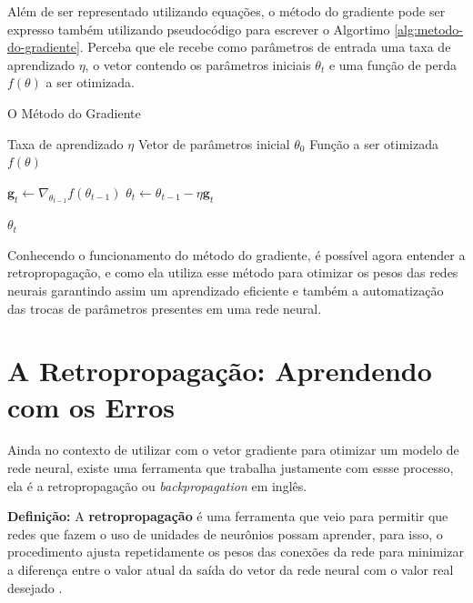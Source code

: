 Além de ser representado utilizando equações, o método do gradiente pode ser expresso também utilizando pseudocódigo para escrever o Algortimo \ref{alg:metodo-do-gradiente}. Perceba que ele recebe como parâmetros de entrada uma taxa de aprendizado $\eta$, o vetor contendo os parâmetros iniciais $\theta_t$ e uma função de perda $f(\theta)$ a ser otimizada.

\begin{algorithm}[H] %
    \caption{O Método do Gradiente}
    \label{alg:metodo-do-gradiente}
    \begin{algorithmic}[1] %

    \Require Taxa de aprendizado $\eta$
    \Require Vetor de parâmetros inicial $\theta_0$
    \Require Função a ser otimizada $f(\theta)$

        \State $\textbf{g}_t \leftarrow \nabla_{\theta_{t-1}} f(\theta_{t-1})$
        \State $\theta_t \leftarrow \theta_{t-1} - \eta \textbf{g}_t$
    \EndWhile

    \State \Return $\theta_t$ 
    \end{algorithmic}
\end{algorithm}

Conhecendo o funcionamento do método do gradiente, é possível agora entender a retropropagação, e como ela utiliza esse método para otimizar os pesos das redes neurais garantindo assim um aprendizado eficiente e também a automatização das trocas de parâmetros presentes em uma rede neural.


\section{A Retropropagação: Aprendendo com os Erros} 

Ainda no contexto de utilizar com o vetor gradiente para otimizar um modelo de rede neural, existe uma ferramenta que trabalha justamente com essse processo, ela é a retropropagação ou \textit{backpropagation} em inglês.

\begin{definicaomoderna}{\textbf{Definição:}}
A \textbf{retropropagação} é uma ferramenta que veio para permitir que redes que fazem o uso de unidades de neurônios possam aprender, para isso, o procedimento ajusta repetidamente os pesos das conexões da rede para minimizar a diferença entre o valor atual da saída do vetor da rede neural com o valor real desejado \parencite{BackpropagationArticle}.
\end{definicaomoderna}

